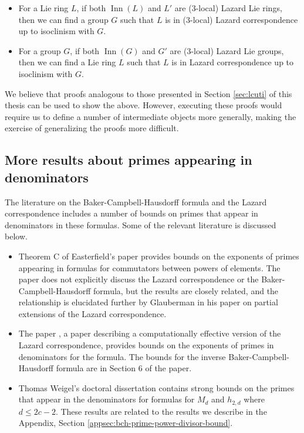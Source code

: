 \begin{itemize}

\item For a Lie ring $L$, if both $\operatorname{Inn}(L)$ and $L'$ are
  ($3$-local) Lazard Lie rings, then we can find a group $G$ such that
  $L$ is in ($3$-local) Lazard correspondence up to isoclinism with
  $G$.
\item For a group $G$, if both $\operatorname{Inn}(G)$ and $G'$ are
  ($3$-local) Lazard Lie groups, then we can find a Lie ring $L$ such
  that $L$ is in Lazard correspondence up to isoclinism with $G$.
\end{itemize}

We believe that proofs analogous to those presented in Section
\ref{sec:lcuti} of this thesis can be used to show the above. However,
executing these proofs would require us to define a number of
intermediate objects more generally, making the exercise of
generalizing the proofs more difficult.

\subsection{More results about primes appearing in denominators}\label{sec:prime-denominator-more}

The literature on the Baker-Campbell-Hausdorff formula and the Lazard
correspondence includes a number of bounds on primes that appear in
denominators in these formulas. Some of the relevant literature is
discussed below.

\begin{itemize}
\item Theorem C of Easterfield's paper \cite{Easterfield} provides
  bounds on the exponents of primes appearing in formulas for
  commutators between powers of elements. The paper does not
  explicitly discuss the Lazard correspondence or the
  Baker-Campbell-Hausdorff formula, but the results are closely
  related, and the relationship is elucidated further by Glauberman in
  his paper \cite{Partialextensions} on partial extensions of the
  Lazard correspondence.
\item The paper \cite{Lazardeffective}, a paper describing a
  computationally effective version of the Lazard correspondence,
  provides bounds on the exponents of primes in denominators for the
  formula. The bounds for the inverse Baker-Campbell-Hausdorff formula
  are in Section 6 of the paper.
\item Thomas Weigel's doctoral dissertation \cite{Weigel} contains
  strong bounds on the primes that appear in the denominators for
  formulas for $M_d$ and $h_{2,d}$ where $d \le 2c - 2$. These results
  are related to the results we describe in the Appendix, Section
  \ref{appsec:bch-prime-power-divisor-bound}.
\end{itemize}

